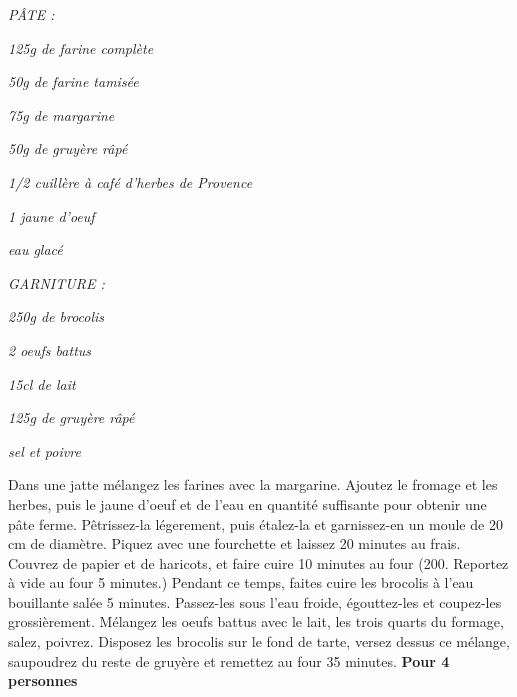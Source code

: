 \documentclass[10pt,a4paper]{report}
\begin{document}
    \begin{multicols}{2}
        \parbox[1cm]{\textwidth}{
            \begin{description}
                \item
                \textit{PÂTE :}
                \item
                \textit{125g de farine complète}
                \item
                \textit{50g de farine tamisée}
                \item
                \textit{75g de margarine}
                \item
                \textit{50g de gruyère râpé}
                \item
                \textit{1/2 cuillère à café d'herbes de Provence}
                \item
                \textit{1 jaune d'oeuf}
                \item
                \textit{eau glacé}
                \item
                \item {}
                \textit{GARNITURE :}
                \item
                \textit{250g de brocolis}
                \item
                \textit{2 oeufs battus}
                \item
                \textit{15cl de lait}
                \item
                \textit{125g de gruyère râpé}
                \item
                \textit{sel et poivre}
            \end{description}
        }
        \columnbreak
        \newline
        Dans une jatte mélangez les farines avec la margarine. Ajoutez le fromage et les herbes, puis le jaune d'oeuf et de l'eau en quantité suffisante pour obtenir une pâte ferme.
        \newline
        Pêtrissez-la légerement, puis étalez-la et garnissez-en un moule de 20 cm de diamètre. Piquez avec une fourchette et laissez 20 minutes au frais. Couvrez de papier et de haricots, et faire cuire 10 minutes au four (200\textdegree. Reportez à vide au four 5 minutes.)
        \newline
        Pendant ce temps, faites cuire les brocolis à l'eau bouillante salée 5 minutes. Passez-les sous l'eau froide, égouttez-les et coupez-les grossièrement.
        \newline
        Mélangez les oeufs battus avec le lait, les trois quarts du formage, salez, poivrez. Disposez les brocolis sur le fond de tarte, versez dessus ce mélange, saupoudrez du reste de gruyère et remettez au four 35 minutes.
        \newline
        \textbf{Pour 4 personnes}
    \end{multicols}
    \newpage
\end{document}
